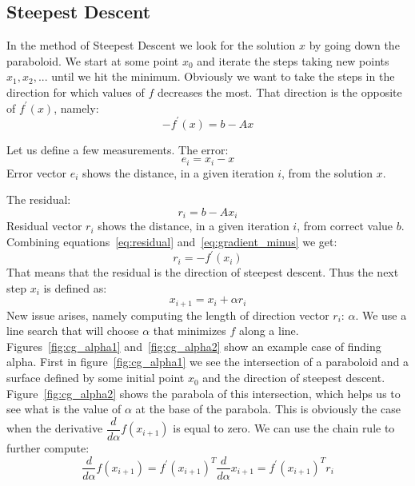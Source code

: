 \documentclass[en]{minipw} %
\begin{document}
\subsection{Steepest Descent}
In the method of Steepest Descent we look for the solution $x$ by going down the paraboloid. We start at some point $x_0$ and iterate the steps taking new points $x_1, x_2 ,...$ until we hit the minimum. Obviously we want to take the steps in the direction for which values of $f$ decreases the most. That direction is the opposite of $f^{'}(x)$, namely:
\begin{equation}
\label{eq:gradient_minus}
-f^{'}(x) = b - Ax
\end{equation}

Let us define a few measurements. The error:
\begin{equation}
e_i = x_i - x
\end{equation}
Error vector $e_i$ shows the distance, in a given iteration $i$, from the solution $x$.

The residual:
\begin{equation}
\label{eq:residual}
r_i = b - Ax_i
\end{equation}
Residual vector $r_i$ shows the distance, in a given iteration $i$, from correct value $b$.
Combining equations~\ref{eq:residual} and~\ref{eq:gradient_minus} we get:
\begin{equation}
r_i = -f^{'}(x_i)
\end{equation}
That means that the residual is the direction of steepest descent. Thus the next step $x_i$ is defined as:
\begin{equation}
x_{i+1} = x_{i} + \alpha r_{i}
\end{equation}
New issue arises, namely computing the length of direction vector $r_{i}$: $\alpha$.
We use a line search that will choose $\alpha$ that minimizes $f$ along a line. Figures~\ref{fig:cg_alpha1} and~\ref{fig:cg_alpha2} show an example case of finding alpha. First in figure~\ref{fig:cg_alpha1} we see the intersection of a paraboloid and a surface defined by some initial point $x_0$ and the direction of steepest descent. Figure~\ref{fig:cg_alpha2} shows the parabola of this intersection, which helps us to see what is the value of $\alpha$ at the base of the parabola. This is obviously the case when the derivative $\dfrac{d}{d\alpha}f(x_{i+1})$ is equal to zero. We can use the chain rule to further compute:
\begin{equation}
\dfrac{d}{d \alpha}f(x_{i+1}) = f^{'}(x_{i+1})^{T} \dfrac{d}{d \alpha} x_{i+1} = f^{'}(x_{i+1})^{T} r_i
\end{equation}
\end{document}
